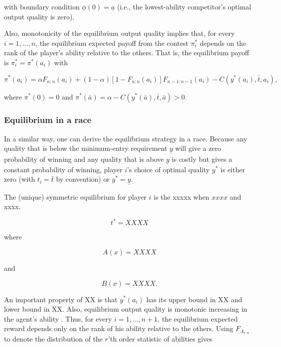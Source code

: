 \documentclass[12pt,]{article}
\theoremstyle{plain} %
\newcommand\deadline{\bar{t}}
\newcommand\target{\underline{y}}
\newcommand\lotype{\underline{a}}
\newcommand\hitype{\bar{a}}
\begin{document}
with boundary condition \(\phi(0) = \lotype\) (i.e., the lowest-ability
competitor's optimal output quality is zero).

Also, monotonicity of the equilibrium output quality implies that, for
every \(i=1, ..., n\), the equilibrium expected payoff from the contest
\(\pi_i^*\) depends on the rank of the player's ability relative to the
others. That is, the equilibrium payoff is \(\pi_i^*=\pi^*(a_i)\) with

\begin{equation} 
    \pi^*(a_i) = \alpha F_{n:n}(a_i) + (1-\alpha)[1-F_{n:n}(a_i)] F_{n-1:n-1}(a_i)  
    - C(y^*(a_i), \deadline, a_i),
\end{equation}

where \(\pi^*(0) = 0\) and
\(\pi^*(\hitype) = \alpha - C(y^*(\hitype), \deadline, \hitype)>0\).

\subsubsection{Equilibrium in a race}\label{equilibrium-in-a-race}

In a similar way, one can derive the equilibrium strategy in a race.
Because any quality that is below the minimum-entry requirement
\(\target\) will give a zero probability of winning and any quality that
is above \(\target\) is costly but gives a constant probability of
winning, player \(i\)'s choice of optimal quality \(y^*\) is either zero
(with \(t_i=\deadline\) by convention) or \(y^*=\target\).

The (unique) symmetric equilibrium for player \(i\) is the xxxxx when
\(xxxx\) and xxxx.

\begin{equation}
t^* = 
    XXXX
\end{equation}

where

\begin{equation}
  A(x) = XXXX
\end{equation}

and

\begin{equation}
  B(x) = XXXX.
\end{equation}

An important property of XX is that \(y^*(a_i)\) has its upper bound in
XX and lower bound in XX. Also, equilibrium output quality is monotonic
increasing in the agent's ability \citep[see][]{moldovanu2001optimal}.
Thus, for every \(i=1, ..., n+1\), the equilibrium expected reward
depends only on the rank of his ability relative to the others. Using
\({F_{A_{r:n}}}\) to denote the distribution of the \(r\)'th order
statistic of abilities gives
\end{document}
